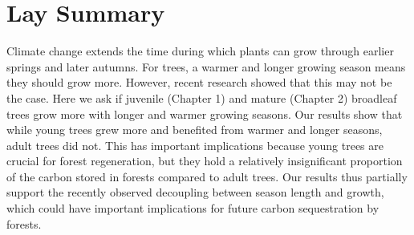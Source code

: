 

\chapter{Lay Summary}
Climate change extends the time during which plants can grow through earlier springs and later autumns. For trees, a warmer and longer growing season means they should grow more. However, recent research showed that this may not be the case. Here we ask if juvenile (Chapter 1) and mature (Chapter 2) broadleaf trees grow more with longer and warmer growing seasons. Our results show that while young trees grew more and benefited from warmer and longer seasons, adult trees did not. This has important implications because young trees are crucial for forest regeneration, but they hold a relatively insignificant proportion of the carbon stored in forests compared to adult trees. Our results thus partially support the recently observed decoupling between season length and growth, which could have important implications for future carbon sequestration by forests.

